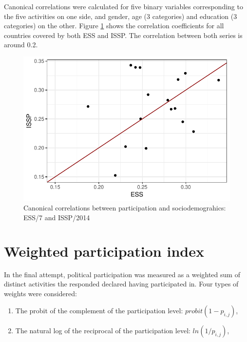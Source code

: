 \documentclass[12pt,]{article}
\providecommand{\tightlist}{%
  \setlength{\itemsep}{0pt}\setlength{\parskip}{0pt}}
\begin{document}
Canonical correlations were calculated for five binary variables corresponding to the five activities on one side, and gender, age (3 categories) and education (3 categories) on the other. Figure \ref{fig:can-cor} shows the correlation coefficients for all countries covered by both ESS and ISSP. The correlation between both series is around 0.2.

\begin{figure}[H]

{\centering \includegraphics{paper_files/figure-latex/can-cor-1} 

}

\caption{Canonical correlations between participation and sociodemograhics: ESS/7 and ISSP/2014}\label{fig:can-cor}
\end{figure}

\hypertarget{weighted-participation-index}{%
\section{Weighted participation index}\label{weighted-participation-index}}

In the final attempt, political participation was measured as a weighted sum of distinct activities the responded declared having participated in. Four types of weights were considered:

\begin{enumerate}
\def\labelenumi{\arabic{enumi}.}
\tightlist
\item
  The probit of the complement of the participation level: \(probit(1 - p_{i,j})\),\\
\item
  The natural log of the reciprocal of the participation level: \(ln(1 / p_{i,j})\),
\end{enumerate}
\end{document}
